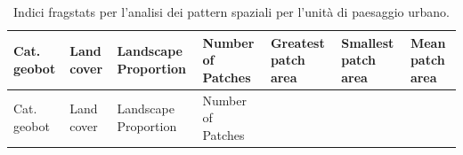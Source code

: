 \documentclass[
  a4paper,
]{book}
\begin{document}
\begin{longtable}[]{@{}
  >{\raggedright\arraybackslash}p{}
  >{\raggedright\arraybackslash}p{}
  >{\centering\arraybackslash}p{}
  >{\raggedright\arraybackslash}p{}
  >{\raggedright\arraybackslash}p{}
  >{\raggedright\arraybackslash}p{}
  >{\raggedright\arraybackslash}p{}@{}}
\caption{\label{tab:fragUrbano} Indici fragstats per l'analisi dei pattern spaziali per l'unità di paesaggio urbano.}\tabularnewline
\toprule\noalign{}
\begin{minipage}[b]{\linewidth}\raggedright
Cat. geobot
\end{minipage} & \begin{minipage}[b]{\linewidth}\raggedright
Land cover
\end{minipage} & \begin{minipage}[b]{\linewidth}\centering
Landscape Proportion
\end{minipage} & \begin{minipage}[b]{\linewidth}\raggedright
Number of Patches
\end{minipage} & \begin{minipage}[b]{\linewidth}\raggedright
Greatest patch area
\end{minipage} & \begin{minipage}[b]{\linewidth}\raggedright
Smallest patch area
\end{minipage} & \begin{minipage}[b]{\linewidth}\raggedright
Mean patch area
\end{minipage} \\
\midrule\noalign{}
\endfirsthead
\toprule\noalign{}
\begin{minipage}[b]{\linewidth}\raggedright
Cat. geobot
\end{minipage} & \begin{minipage}[b]{\linewidth}\raggedright
Land cover
\end{minipage} & \begin{minipage}[b]{\linewidth}\centering
Landscape Proportion
\end{minipage} & \begin{minipage}[b]{\linewidth}\raggedright
Number of Patches
\end{minipage} & \begin{minipage}[b]{\linewidth}\raggedright

\end{minipage}
\end{longtable}
\end{document}
